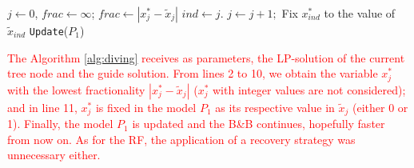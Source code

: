 \documentclass{ro}
\begin{document}








\begin{algorithm}[!h]
	\caption{\hspace{-1mm}\textbf{: Diving  }($\hat{x}^*,\tilde{x}$)}
	\label{alg:diving}
	{\footnotesize
		\begin{algorithmic}[1]	
			\STATE $j\gets0$, $frac \gets \infty$;
            				
					\STATE $frac\gets |{x}_j^* - \tilde{x}_j|$
					\STATE $ind \gets j$.
				\ENDIF
				\STATE $j \gets j +1;$
			\ENDIF
			\ENDWHILE
			\STATE Fix ${x}_{ind}^*$ to the value of $\tilde{x}_{ind}$ 
			\STATE \texttt{Update}($P_1$)
		\end{algorithmic}
	}
\end{algorithm}

\textcolor{red}{The Algorithm \ref{alg:diving} receives as parameters, the LP-solution of the current tree node and the guide solution. From lines 2 to 10, we obtain the variable $x_j^*$ with the lowest fractionality $|{x}_j^* - \tilde{x}_j|$ ($x_j^*$ with integer values are not considered); and in line 11, ${x}_j^*$ is fixed in the model $P_1$ as its respective value in $\tilde{x}_j$ (either 0 or 1). Finally, the model $P_1$ is updated and the B\&B continues, hopefully faster from now on.}  \textcolor{red}{As for the RF, the  application of a recovery strategy was unnecessary either.}



\end{document}
